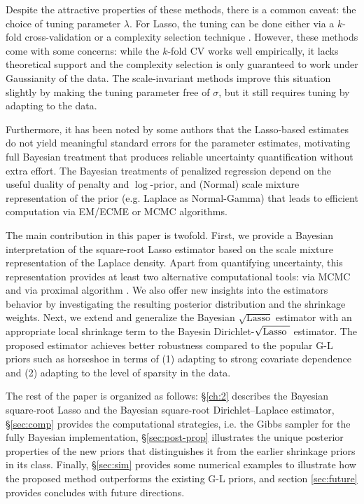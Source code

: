 \documentclass[ba]{imsart}
\def\sql{$\sqrt{\text{Lasso}}$}
\def\sqdl{Dirichlet-$\sqrt{\text{\rm{Lasso} }}$}
\begin{document}
Despite the attractive properties of these methods, there is a common caveat: the choice of tuning parameter $\lambda$. For Lasso, the tuning can be done either via a $k$-fold cross-validation or a complexity selection technique \citep{giraud2012high}. However, these methods come with some concerns: while the $k$-fold CV works well empirically, it lacks theoretical support and the complexity selection is only guaranteed to work under Gaussianity of the data. The scale-invariant methods improve this situation slightly by making the tuning parameter free of $\sigma$, but it still requires tuning by adapting to the data. 

Furthermore, it has been noted by some authors \citep{chatterjee2011bootstrap} that the Lasso-based estimates do not yield meaningful standard errors for the parameter estimates, motivating full Bayesian treatment that produces reliable uncertainty quantification without extra effort. The Bayesian treatments of penalized regression depend on the useful duality of penalty and $\log$-prior, and (Normal) scale mixture representation of the prior (e.g. Laplace as Normal-Gamma) that leads to efficient computation via EM/ECME or MCMC algorithms. 

The main contribution in this paper is twofold. First, we provide a Bayesian interpretation of the square-root Lasso estimator based on the scale mixture representation of the Laplace density. Apart from quantifying uncertainty, this representation provides at least two alternative computational tools: via MCMC and via proximal algorithm \citep{polson2015proximal}. We also offer new insights into the estimators behavior by investigating the resulting posterior distribution and the shrinkage weights. Next, we extend and generalize the Bayesian \sql{} estimator with an appropriate local shrinkage term to the Bayesin \sqdl{} estimator. The proposed estimator achieves better robustness compared to the popular G-L priors such as horseshoe in terms of (1) adapting to strong covariate dependence and (2) adapting to the level of sparsity in the data. 

The rest of the paper is organized as follows: \S \ref{ch:2} describes the Bayesian square-root Lasso and the Bayesian square-root Dirichlet--Laplace estimator, \S \ref{sec:comp} provides the computational strategies, i.e. the Gibbs sampler for the fully Bayesian implementation, \S \ref{sec:post-prop} illustrates the unique posterior properties of the new priors that distinguishes it from the earlier shrinkage priors in its class. Finally, \S \ref{sec:sim} provides some numerical examples to illustrate how the proposed method outperforms the existing G-L priors, and section \ref{sec:future} provides concludes with future directions.  
\end{document}
